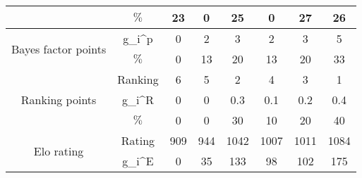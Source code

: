 \begin{tabular}{|cc|c|c|c|c|c|c|}
          & $\%$ &                                       23 &                                        0 &                                       25 &                                        0 &                                       27 &                                       26 \\
\cline{1-8}
\hline \multirow{2}{*}{Bayes factor points} & g_i^p &                                        0 &                                        2 &                                        3 &                                        2 &                                        3 &                                        5 \\
          & $\%$ &                                        0 &                                       13 &                                       20 &                                       13 &                                       20 &                                       33 \\
\cline{1-8}
\hline \multirow{3}{*}{Ranking points} & Ranking &                                        6 &                                        5 &                                        2 &                                        4 &                                        3 &                                        1 \\
          & g_i^R &                                        0 &                                        0 &                                      0.3 &                                      0.1 &                                      0.2 &                                      0.4 \\
          & $\%$ &                                        0 &                                        0 &                                       30 &                                       10 &                                       20 &                                       40 \\
\cline{1-8}
\hline \multirow{3}{*}{Elo rating} & Rating &                                      909 &                                      944 &                                     1042 &                                     1007 &                                     1011 &                                     1084 \\
          & g_i^E &                                        0 &                                       35 &                                      133 &                                       98 &                                      102 &                                      175 \\

\end{tabular}
